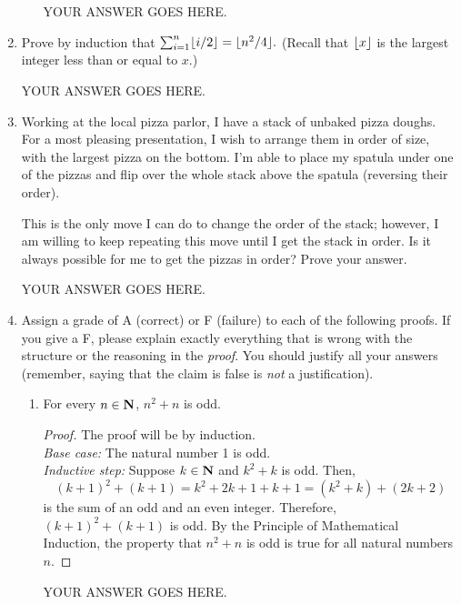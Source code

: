 \documentclass[11pt,fleqn]{article}
\begin{document}
\begin{enumerate}
\begin{enumerate}
YOUR ANSWER GOES HERE.
\end{enumerate}


\item
Prove by induction that $\sum_{i=1}^n \lfloor i/2 \rfloor = \lfloor n^2/4 \rfloor.$
(Recall that $\lfloor x \rfloor$ is the largest integer less than or equal to $x$.)

YOUR ANSWER GOES HERE.

\item
Working at the local pizza parlor, I have a stack of unbaked
pizza doughs.
For a most pleasing presentation, I wish
to arrange them in order of size, with the largest pizza on the bottom.
I'm able to place my spatula under one of the pizzas and flip over
the whole stack above the spatula (reversing their order).

This is the only move I can do to change the order of the stack;
however, I am willing to keep repeating this move until I get the stack
in order.
Is it always possible for me to get the pizzas in order?
Prove your answer.

YOUR ANSWER GOES HERE.

\item
Assign a grade of A (correct) or F (failure) to
each of the following proofs.  If you give a F, please
explain exactly everything that is wrong with the structure or the reasoning in the
{\it proof}. You should justify all your
answers (remember, saying that the claim is false is {\it not} 
a justification).

\begin{enumerate}
\item
\begin{theorem}
For every $n \in \mbox{{\bfseries N}}$, $n^2+n$ is odd.
\end{theorem}
\begin{proof}
The proof will be by induction.\\
\emph{Base case:} The natural number 1 is odd.\\
\emph{Inductive step:} Suppose $k \in \mbox{{\bfseries N}}$ and $k^2 + k$ is odd.  Then,
$${(k+1)^2 + (k+1) = k^2 + 2k + 1 + k +1 = (k^2 + k) + (2k+2) }$$
is the sum of an odd and an even integer.  Therefore, $(k+1)^2 + (k+1)$
is odd.  By the Principle of Mathematical Induction, the property that
$n^2+n$ is odd is true for all natural numbers $n$. 
\end{proof}

YOUR ANSWER GOES HERE.


\end{enumerate}
\end{enumerate}
\end{document}
